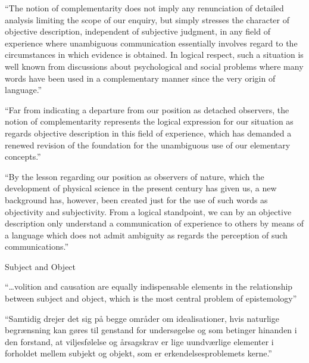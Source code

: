 \documentclass[fleqn]{beamer}
\begin{document}
\begin{frame}{\mbox{}}

  ``The notion of complementarity does not imply any renunciation of
  detailed analysis limiting the scope of our enquiry, but simply
  stresses the character of objective description, independent of
  subjective judgment, in any field of experience where unambiguous
  communication essentially involves regard to the circumstances in
  which evidence is obtained. In logical respect, such a situation is
  well known from discussions about psychological and social problems
  where many words have been used in a complementary manner since the
  very origin of language.'' \citep[1105]{rutherford}


\nocite{koch2016danske}

\end{frame}




\begin{frame}{\mbox{}}

  ``Far from indicating a departure from our position as detached
  observers, the notion of complementarity represents the logical
  expression for our situation as regards objective description in
  this field of experience, which has demanded a renewed revision of
  the foundation for the unambiguous use of our elementary concepts.''
  \citep[54]{unity55}


\end{frame}

\begin{frame}{\mbox{}}

  ``By the lesson regarding our position as observers of nature, which
  the development of physical science in the present century has given
  us, a new background has, however, been created just for the use of
  such words as objectivity and subjectivity. From a logical
  standpoint, we can by an objective description only understand a
  communication of experience to others by means of a language which
  does not admit ambiguity as regards the perception of such
  communications.'' \citep[386]{religion54}

\end{frame}


\begin{frame}{Subject and Object}

  ``\dots volition and causation are equally indispensable elements in
  the relationship between subject and object, which is the most
  central problem of epistemology''

  \bigskip ``Samtidig drejer det sig på begge områder om
  idealisationer, hvis naturlige begrænsning kan gøres til genstand
  for undersøgelse og som betinger hinanden i den forstand, at
  viljesfølelse og årsagskrav er lige uundværlige elementer i
  forholdet mellem subjekt og objekt, som er erkendelsesproblemets
  kerne.'' \citep[82]{bohr-atomteori}

\end{frame}
\end{document}
